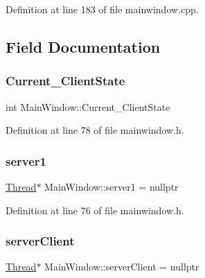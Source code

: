 Definition at line 183 of file mainwindow.\+cpp.



\subsection{Field Documentation}
\mbox{\label{class_main_window_affb1fd097003ff34d7b303df15d0226f}} 
\subsubsection{\texorpdfstring{Current\+\_\+\+Client\+State}{Current\_ClientState}}
{\footnotesize\ttfamily int Main\+Window\+::\+Current\+\_\+\+Client\+State\hspace{0.3cm}{\ttfamily [private]}}



Definition at line 78 of file mainwindow.\+h.

\mbox{\label{class_main_window_a2c0272c6ec7afab48294439cbe9d9a95}} 
\subsubsection{\texorpdfstring{server1}{server1}}
{\footnotesize\ttfamily \mbox{\hyperlink{class_thread}{Thread}}$\ast$ Main\+Window\+::server1 = nullptr\hspace{0.3cm}{\ttfamily [private]}}



Definition at line 76 of file mainwindow.\+h.

\mbox{\label{class_main_window_ab00c61864beef23e6dc68f2e11c2aefd}} 
\subsubsection{\texorpdfstring{server\+Client}{serverClient}}
{\footnotesize\ttfamily \mbox{\hyperlink{class_thread}{Thread}}$\ast$ Main\+Window\+::server\+Client = nullptr\hspace{0.3cm}{\ttfamily [private]}}



